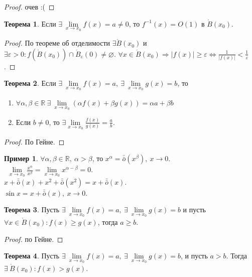 \documentclass[a4paper, 12pt]{article}
\newcommand{\R}{\mathbb{R}}
\newcommand{\Bo}{\mathring{B}}
\renewcommand{\epsilon}{\varepsilon}
\renewcommand{\emptyset}{\varnothing}
\newcommand{\om}{\bar{\bar{o}}}
\theoremstyle{definition}
\newtheorem*{theorem}{Теорема}
\newtheorem*{example}{Пример}
\begin{document}
        \begin{proof}
            очев :(
        \end{proof}
        \begin{theorem}
            Если $\exists\ \lim\limits_{x\to x_0}f(x)=a\ne 0$, то $f^{-1}(x)=O(1)$ в $\Bo(x_0)$.
        \end{theorem} 
        \begin{proof}
            По теореме об отделимости $\exists \Bo(x_0)$ и $\exists \epsilon>0: f(\Bo(x_0))\cap \Bo_{\epsilon}(0)\ne \emptyset$. $\forall x\in \Bo(x_0) \Rightarrow |f(x)|\geq \epsilon \Leftrightarrow \frac{1}{|f(x)|}<\frac{1}{\epsilon}$. 
        \end{proof} 
        \begin{theorem}
            Если $\exists\ \lim\limits_{x\to x_0}f(x)=a,\ \exists\ \lim\limits_{x\to x_0}g(x)=b$, то
            \begin{enumerate}
                \item $\forall \alpha,\beta\in \R\ \exists\ \lim\limits_{x\to x_0}(\alpha f(x)+\beta g(x))=\alpha a+\beta b$
                \item Если $b\ne 0$, то $\exists \lim\limits_{x\to x_0}\frac{f(x)}{g(x)}=\frac{a}{b}$.
            \end{enumerate}
        \end{theorem} 
        \begin{proof}
            По Гейне.
        \end{proof}
        \begin{example}
            $\forall \alpha, \beta\in \R,\ \alpha>\beta$, то $x^{\alpha}=\om(x^{\beta}),\ x\to 0$.\\\
            $\lim\limits_{x\to x_0}\frac{x^{\alpha}}{x^{\beta}}=\lim\limits_{x\to x_0}x^{\alpha-\beta}=0$.\\
            $x+\om(x)+x^2+\om(x^2)=x+\om(x)$.\\
            $\sin{x}=x+\om(x),\ x\to 0$.
        \end{example}
        \begin{theorem}
            Пусть $\exists\ \lim\limits_{x\to x_0}f(x)=a,\ \exists\ \lim\limits_{x\to x_0}g(x)=b$ и пусть $\forall x\in \Bo(x_0): f(x)\geq g(x)$, тогда $a\geq b$.
        \end{theorem} 
        \begin{proof}
            по Гейне.
        \end{proof} 
        \begin{theorem}
            Пусть $\exists\ \lim\limits_{x\to x_0}f(x)=a,\ \exists\ \lim\limits_{x\to x_0}g(x)=b$, и пусть $a>b$. Тогда $\exists\ \Bo(x_0): f(x)>g(x)$.
        \end{theorem}
\end{document}
